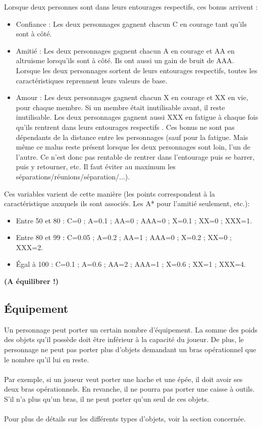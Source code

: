 Lorsque deux personnes sont dans leurs entourages respectifs, ces bonus arrivent :
\begin{itemize}
   \item Confiance : Les deux personnages gagnent chacun C en courage tant qu'ils sont à côté.
   \item Amitié : Les deux personnages gagnent chacun A en courage et AA en altruisme lorsqu'ils sont à côté. Ils ont aussi un gain de bruit de AAA. Lorsque les deux personnages sortent de leurs entourages respectifs, toutes les caractéristiques reprennent leurs valeurs de base.
   \item Amour : Les deux personnages gagnent chacun X en courage et XX en vie, pour chaque membre. Si un membre était inutilisable avant, il reste inutilisable. Les deux personnages gagnent aussi XXX en fatigue à chaque fois qu'ils rentrent dans leurs entourages respectifs . Ces bonus ne sont pas dépendants de la distance entre les personnages (sauf pour la fatigue. Mais même ce malus reste présent lorsque les deux personnages sont loin, l'un de l'autre. Ce n'est donc pas rentable de rentrer dans l'entourage puis se barrer, puis y retourner, etc. Il faut éviter au maximum les séparations/réunions/séparation/...).
\end{itemize}
Ces variables varient de cette manière (les points correspondent à la caractéristique auxquels ils sont associés. Les A* pour l'amitié seulement, etc.):
\begin{itemize}
   \item Entre 50 et 80 : C=0 ; A=0.1 ; AA=0 ; AAA=0 ; X=0.1 ; XX=0 ; XXX=1.
   \item Entre 80 et 99 : C=0.05 ; A=0.2 ; AA=1 ; AAA=0 ; X=0.2 ; XX=0 ; XXX=2.
   \item Égal à 100 : C=0.1 ; A=0.6 ; AA=2 ; AAA=1 ; X=0.6 ; XX=1 ; XXX=4.
\end{itemize}
\textbf{(A équilibrer !)}
\subsection{Équipement}
Un personnage peut porter un certain nombre d'équipement. La somme des poids des objets qu'il possède doit être inférieur à la capacité du joueur. De plus, le personnage ne peut pas porter plus d'objets demandant un bras opérationnel que le nombre qu'il lui en reste.
\\\\
Par exemple, si un joueur veut porter une hache et une épée, il doit avoir ses deux bras opérationnels. En revanche, il ne pourra pas porter une caisse à outils. S'il n'a plus qu'un bras, il ne peut porter qu'un seul de ces objets.
\\\\
Pour plus de détails sur les différents types d'objets, voir la section concernée.
